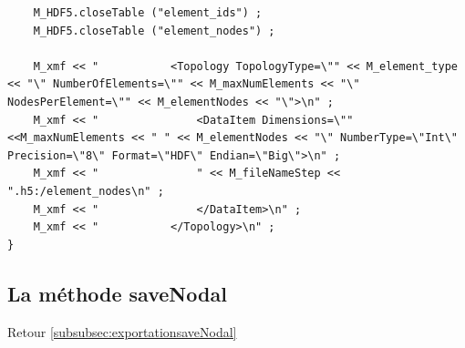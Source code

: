 \documentclass[12pt]{article}
\begin{document}
\begin{lstlisting}
    M_HDF5.closeTable ("element_ids") ;
    M_HDF5.closeTable ("element_nodes") ;

    M_xmf << "           <Topology TopologyType=\"" << M_element_type << "\" NumberOfElements=\"" << M_maxNumElements << "\" NodesPerElement=\"" << M_elementNodes << "\">\n" ;
    M_xmf << "               <DataItem Dimensions=\"" <<M_maxNumElements << " " << M_elementNodes << "\" NumberType=\"Int\" Precision=\"8\" Format=\"HDF\" Endian=\"Big\">\n" ;
    M_xmf << "               " << M_fileNameStep << ".h5:/element_nodes\n" ;
    M_xmf << "               </DataItem>\n" ;
    M_xmf << "           </Topology>\n" ;
}
\end{lstlisting}
\newpage
\subsection {La méthode saveNodal}
\label{subsec:saveNodal}
Retour \ref{subsubsec:exportationsaveNodal}
\end{document}
